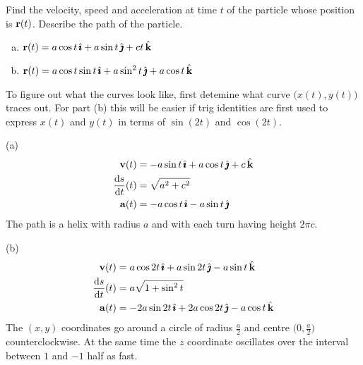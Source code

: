 \begin{question}
Find the velocity, speed and acceleration at time $t$ of
the particle whose position is $\mathbf{r}(t)$. Describe the path of the particle.
\begin{enumerate}[(a)]
\item
$\mathbf{r}(t)= a \cos t\,\hat{\pmb{\imath}} + a\sin t\,\hat{\pmb{\jmath}} + ct\,\hat{\mathbf{k}}$
\item
$\mathbf{r}(t)= a \cos t\sin t\,\hat{\pmb{\imath}} + a\sin^2 t\,\hat{\pmb{\jmath}} + a\cos t\,\hat{\mathbf{k}}$
\end{enumerate}
\end{question}

\begin{hint}
To figure out what the curves look like, first detemine what curve
$\big(x(t),y(t)\big)$ traces out. For part (b) this will be easier
if trig identities are first used to express $x(t)$ and $y(t)$ in terms of
$\sin(2t)$ and $\cos(2t)$.
\end{hint}

\begin{answer}
(a) 
\begin{align*}
\vv(t)&= -a \sin t\,\hi+a\cos t\,\hj+c\,\hk\\
\diff{s}{t}(t)&= \sqrt{a^2+c^2}\\
\va(t)&= -a \cos t\,\hi-a\sin t\,\hj
\end{align*}
The path is a helix with radius $a$ and with each turn having height $2\pi c$.

(b)
\begin{align*}
\vv(t)&= a \cos 2t\,\hi +a\sin 2t\,\hj-a\sin t\,\hk\\
\diff{s}{t}(t)&= a\sqrt{1+\sin^2t}\\
\va(t)&= -2a \sin 2t\,\hi +2a\cos 2t\,\hj-a\cos t\,\hk
\end{align*}
The $(x,y)$ coordinates go around a circle of radius $\frac{a}{2}$ and
centre $\big(0,\frac{a}{2}\big)$ counterclockwise. At the same time the $z$ coordinate oscillates over the interval between $1$ and $-1$ half as fast.
\end{answer}

